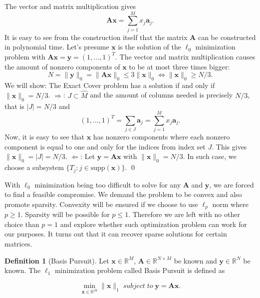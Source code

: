\documentclass[11pt,oneside,czech,american]{book} %
\theoremstyle{definition} %
\theoremstyle{definition}
\newtheorem{defn}{Definition}
\newtheorem{rmrk}{Remark}
\begin{document}
The vector and matrix multiplication gives
\begin{equation*}
	\bm{A} \bm{x}=\sum_{j=1}^{M}x_j \bm{a}_{j}.
\end{equation*}
It is easy to see from the construction itself that the matrix $\bm{A}$ can be constructed in polynomial time. Let's presume $\bm{x}$ is the solution of the $\ell_{0}$ minimization problem with $\bm{A} \bm{x}= \bm{y} = (1,\dots,1)^{T}$. The vector and matrix multiplication causes the amount of nonzero components of $\bm{x}$ to be at most three times bigger:
\begin{equation*}
	N = \lVert \bm{y} \rVert_{0} = \lVert \bm{A} \bm{x}\rVert_{0}\leq 3 \lVert \bm{x} \rVert_{0} \Leftrightarrow \lVert \bm{x} \rVert_{0} \geq N/3.
\end{equation*}
We will show: The Exact Cover problem has a solution if and only if $\lVert \bm{x} \rVert_{0} = N/3$.\newline
$\Rightarrow$: $ J \subset \hat{M}$ and the amount of columns needed is precisely $N/3$, that is $|J| = N/3$ and
\begin{equation*}
	(1,\dots,1)^{T} = \sum_{j \in J} \bm{a}_j = \sum_{j =1}^{M} x_j \bm{a}_j.
\end{equation*}
Now, it is easy to see that $\bm{x}$ has nonzero components where each nonzero component is equal to one and only for the indices from index set $J$. This gives $\lVert \bm{x}\rVert_{0}=|J|= N/3$.
\newline
$\Leftarrow$:
Let $\bm{y}=\bm{A}\bm{x}$ with $\lVert \bm{x}\rVert_{0}=N/3$. In such case, we choose a subsystem $\{T_j: j \in \text{supp}(\bm{x})\}$.
\qed

\medskip
	With $\ell_{0}$ minimization being too difficult to solve for any $\bm{A}$ and $\bm{y}$, we are forced to find a feasible compromise. We demand the problem to be convex and also promote sparsity. Convexity will be ensured if we choose to use $\ell_{p}$ norm where $p\geq 1$. Sparsity will be possible for $p\leq 1$. Therefore we are left with no other choice than $p = 1$ and explore whether such optimization problem can work for our purposes. It turns out that it can recover sparse solutions for certain matrices.

\begin{defn}[Basis Pursuit]
	Let $\bm{x} \in \mathbb{R}^{M}$, $\bm{A} \in \mathbb{R}^{N \times M}$ be known and $\bm{y} \in \mathbb{R}^{N}$ be known. The $\ell_{1}$ minimization problem called Basis Pursuit is defined as
	
	\begin{equation}
		\min_{\bm{{x}} \in \mathbb{R}^{M}}\lVert \bm{x}\rVert_{1} \;subject\; to\; \bm{y} = \bm{A} \bm{x}. \label{Basis Pursuit}
	\end{equation}
\end{defn}
\end{document}
